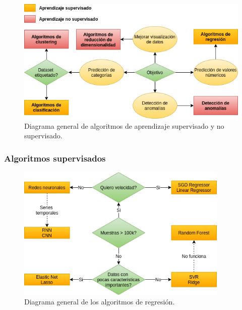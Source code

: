 \documentclass[a4paper,12pt]{article}
\begin{document}
\begin{figure}[H]
	\begin{center}				
	\includegraphics[width=1\textwidth]{maindiagram.png}
  	\caption{Diagrama general de algoritmos de aprendizaje supervisado y no supervisado.}
  	\label{fig:maindiagram.}
  	\end{center}
\end{figure}

\subsubsection{Algoritmos supervisados}

\begin{figure}[H]
	\begin{center}				
	\includegraphics[width=0.9\textwidth]{regressiondiagram.png}
  	\caption{Diagrama general de los algoritmos de regresión.}
  	\label{fig:regressiondiagram.}
  	\end{center}
\end{figure}
\end{document}
